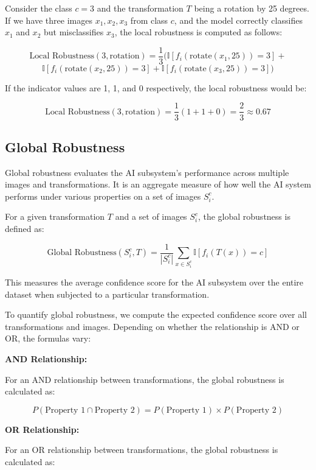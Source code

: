 \begin{example}
Consider the class \( c = 3 \) and the transformation \( T \) being a rotation by 25 degrees. If we have three images \( x_1, x_2, x_3 \) from class \( c \), and the model correctly classifies \( x_1 \) and \( x_2 \) but misclassifies \( x_3 \), the local robustness is computed as follows:

\[
\text{Local Robustness}(3, \text{rotation}) = \frac{1}{3} (\mathbb{I}[f_i(\text{rotate}(x_1, 25)) = 3] + 
\]
\[
\mathbb{I}[f_i(\text{rotate}(x_2, 25)) = 3] + \mathbb{I}[f_i(\text{rotate}(x_3, 25)) = 3])
\]


If the indicator values are 1, 1, and 0 respectively, the local robustness would be:

\[
\text{Local Robustness}(3, \text{rotation}) = \frac{1}{3} (1 + 1 + 0) = \frac{2}{3} \approx 0.67
\]
\end{example}

\subsection{Global Robustness}

Global robustness evaluates the AI subsystem's performance across multiple images and transformations. It is an aggregate measure of how well the AI system performs under various properties on a set of images $S_i^c$.

For a given transformation $T$ and a set of images $S_i^c$, the global robustness is defined as:

$$ \text{Global Robustness}(S_i^c, T) = \frac{1}{|S_i^c|} \sum_{x \in S_i^c} \mathbb{I}[f_i(T(x)) = c] $$

This measures the average confidence score for the AI subsystem over the entire dataset when subjected to a particular transformation.

To quantify global robustness, we compute the expected confidence score over all transformations and images. Depending on whether the relationship is AND or OR, the formulas vary:

\textbf{AND Relationship:}

For an AND relationship between transformations, the global robustness is calculated as:

$$ P(\text{Property 1} \cap \text{Property 2}) = P(\text{Property 1}) \times P(\text{Property 2}) $$

\textbf{OR Relationship:}

For an OR relationship between transformations, the global robustness is calculated as:

